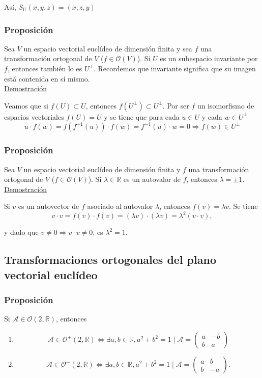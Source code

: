 \documentclass[12pt, a4paper, ones, notitlepage, openany,titlepage]{article}
\begin{document}
\noindent Así, $S_{U}(x, y, z)=(x, z, y)$

\subsubsection{Proposición}
Sea $V$ un espacio vectorial euclídeo de dimensión finita y sea $f$ una transformación ortogonal de $V$ ($f \in \mathcal{O}(V)$). Si $U$ es un subespacio invariante por $f$, entonces también lo es $U^{\perp}$. Recordemos que invariante significa que su imagen está contenida en sí mismo.\\

\noindent\underline{Demostración}

Veamos que si $f(U) \subset U$, entonces $f\left(U^{\perp}\right) \subset U^{\perp}$. Por ser $f$ un isomorfismo de espacios vectoriales $f(U)=U$ y se tiene que para cada $u \in U$ y cada $w \in U^{\perp}$
$$
u \cdot f(w)=f\left(f^{-1}(u)\right) \cdot f(w)=f^{-1}(u) \cdot w=0 \Longrightarrow f(w) \in U^\perp
$$

\subsubsection{Proposición}
Sea $V$ un espacio vectorial euclídeo de dimensión finita y $f$ una transformación ortogonal de $V$ ($f \in \mathcal{O}(V)$). Si $\lambda \in \mathbb{R}$ es un autovalor de $f$, entonces $\lambda= \pm 1$.\\

\noindent\underline{Demostración}

Si $v$ es un autovector de $f$ asociado al autovalor $\lambda$, entonces $f(v)=\lambda v$. Se tiene
$$
v \cdot v=f(v) \cdot f(v)=(\lambda v) \cdot(\lambda v)=\lambda^{2} (v \cdot v),
$$

\noindent y dado que $v \neq 0 \Longrightarrow v \cdot v \neq 0$, es $\lambda^{2}=1$.

\subsection{Transformaciones ortogonales del plano vectorial euclídeo}
\subsubsection{Proposición}
Si $\mathcal{A} \in \mathcal{O}(2, \mathbb{R})$, entonces
\begin{enumerate}[label=(\arabic*)]
	\item 
	$$
	\mathcal{A} \in \mathcal{O}^{+}(2, \mathbb{R}) \Longleftrightarrow \exists a, b \in \mathbb{R}, a^{2}+b^{2}=1 \mid \mathcal{A}=\left(\begin{array}{rr}
		a & -b \\
		b & a
	\end{array}\right)
	$$
	\item
	$$
	\mathcal{A} \in \mathcal{O}^{-}(2, \mathbb{R}) \Longleftrightarrow \exists a, b \in \mathbb{R}, a^{2}+b^{2}=1 \mid \mathcal{A}=\left(\begin{array}{rr}
		a & b \\
		b & -a
	\end{array}\right) .
	$$
\end{enumerate}
\end{document}

